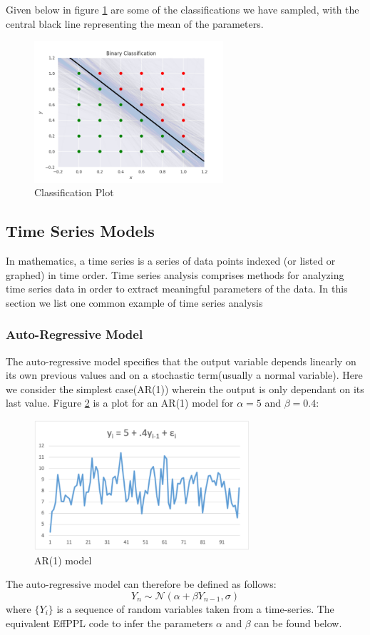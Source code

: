 \documentclass[a4paper,11pt]{article}
\theoremstyle{mytheor}
\begin{document}
        Given below in figure \ref{fig:class} are some of the classifications we have sampled, with the central black line representing the mean of the parameters. 
        \begin{figure}[H]
            \centering
            \includegraphics[width=7cm]{machine_learning/class.png}
            \caption{Classification Plot}
            \label{fig:class}
        \end{figure}
        
    \subsection{Time Series Models}
    In mathematics, a time series is a series of data points indexed (or listed or graphed) in time order. Time series analysis comprises methods for analyzing time series data in order to extract meaningful parameters of the data. In this section we list one common example of time series analysis
        \subsubsection{Auto-Regressive Model}
         The auto-regressive model specifies that the output variable depends linearly on its own previous values and on a stochastic term(usually a normal variable). Here we consider the simplest case(AR(1)) wherein the output is only dependant on its last value. Figure \ref{fig:ar} is a plot for an AR(1) model for $\alpha = 5$ and $\beta = 0.4$:
         \begin{figure}[H]
             \centering
             \includegraphics[width = 8cm]{time-series/ar_plot.png}
             \caption{AR(1) model}
             \label{fig:ar}
         \end{figure}
        The auto-regressive model can therefore be defined as follows:
        \begin{equation*}
            Y_n \sim \mathcal{N}( \alpha + \beta Y_{n-1} , \sigma )
        \end{equation*}
        where $\{Y_i\}$ is a sequence of random variables taken from a time-series. The equivalent EffPPL code to infer the parameters $\alpha$ and $\beta$ can be found below.
        
\end{document}

